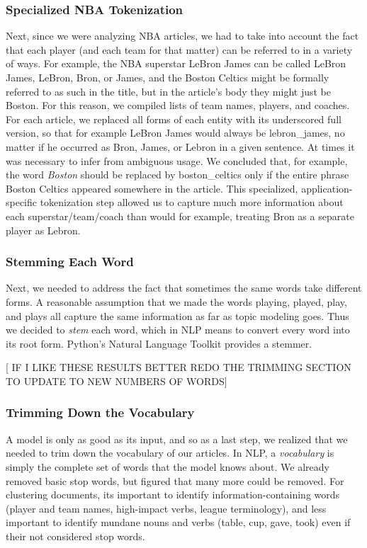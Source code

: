 \documentclass[11pt]{article}
\begin{document}
\subsubsection{Specialized NBA Tokenization}
Next, since we were analyzing NBA articles, we had to take into account the fact that each player (and each team for that matter) can be referred to in a variety of ways. For example, the NBA superstar LeBron James can be called LeBron James, LeBron, Bron, or James, and the Boston Celtics might be formally referred to as such in the title, but in the article's body they might just be Boston. For this reason, we compiled lists of team names, players, and coaches.  For each article, we replaced all forms of each entity with its underscored full version, so that for example LeBron James would always be lebron\_james, no matter if he occurred as Bron, James, or Lebron in a given sentence.  At times it was necessary to infer from ambiguous usage. We concluded that, for example, the word \textit{Boston} should be replaced by boston\_celtics only if the entire phrase Boston Celtics appeared somewhere in the article.  This specialized, application-specific tokenization step allowed us to capture much more information about each superstar/team/coach than would for example, treating Bron as a separate player as Lebron. \\

\subsubsection{Stemming Each Word}
Next, we needed to address the fact that sometimes the same words take different forms. A reasonable assumption that we made the words playing, played, play, and plays all capture the same information as far as topic modeling goes. Thus we decided to \textit{stem} each word, which in NLP means to convert every word into its root form.  Python's Natural Language Toolkit provides a stemmer.

[ IF I LIKE THESE RESULTS BETTER REDO THE TRIMMING SECTION TO UPDATE TO NEW NUMBERS OF WORDS]

\subsubsection{Trimming Down the Vocabulary}
A model is only as good as its input, and so as a last step, we realized that we needed to trim down the vocabulary of our articles. In NLP, a \textit{vocabulary} is simply the complete set of words that the model knows about.  We already removed basic stop words, but figured that many more could be removed. For clustering documents, its important to identify information-containing words (player and team names, high-impact verbs, league terminology), and less important to identify mundane nouns and verbs (table, cup, gave, took) even if their not considered stop words. \\
\end{document}
